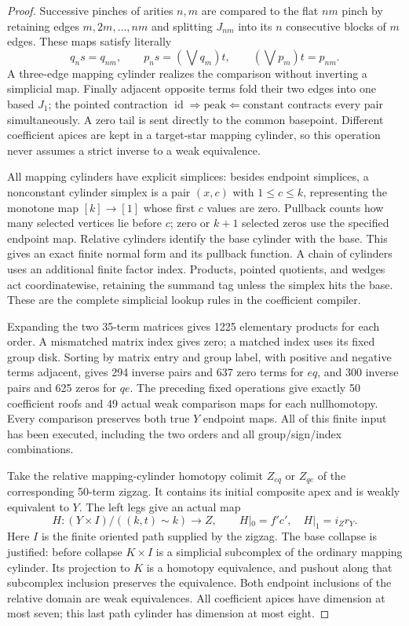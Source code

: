 \begin{proof}
Successive pinches of arities $n,m$ are compared to the flat
$nm$ pinch by retaining edges $m,2m,\ldots,nm$ and splitting
$J_{nm}$ into its $n$ consecutive blocks of $m$ edges. These maps
satisfy literally
\[
 q_ns=q_{nm},\qquad p_ns=(\bigvee q_m)t,\qquad
 (\bigvee p_m)t=p_{nm}.
\]
A three-edge mapping cylinder realizes the comparison without
inverting a simplicial map. Finally adjacent opposite terms fold
their two edges into one based $J_1$; the pointed contraction
$\operatorname{id}\Rightarrow\mathrm{peak}\Leftarrow\mathrm{constant}$
contracts every pair simultaneously. A zero tail is sent directly
to the common basepoint. Different coefficient apices are kept in
a target-star mapping cylinder, so this operation never assumes a
strict inverse to a weak equivalence.

All mapping cylinders have explicit simplices: besides endpoint
simplices, a nonconstant cylinder simplex is a pair $(x,c)$ with
$1\leq c\leq k$, representing the monotone map $[k]\to[1]$ whose
first $c$ values are zero. Pullback counts how many selected
vertices lie before $c$; zero or $k+1$ selected zeros use the
specified endpoint map. Relative cylinders identify the base
cylinder with the base. This gives an exact finite normal form
and its pullback function. A chain of cylinders uses an additional
finite factor index. Products, pointed quotients, and wedges act
coordinatewise, retaining the summand tag unless the simplex
hits the base. These are the complete simplicial lookup rules
in the coefficient compiler.

Expanding the two 35-term matrices gives 1225 elementary products
for each order. A mismatched matrix index gives zero; a matched
index uses its fixed group disk. Sorting by matrix entry and group
label, with positive and negative terms adjacent, gives 294 inverse
pairs and 637 zero terms for $eq$, and 300 inverse pairs and 625
zeros for $qe$. The preceding fixed operations give exactly 50
coefficient roofs and 49 actual weak comparison maps for each
nullhomotopy. Every comparison preserves both true $Y$ endpoint
maps. All of this finite input has been executed, including the
two orders and all group/sign/index combinations.

Take the relative mapping-cylinder homotopy colimit $Z_{eq}$ or
$Z_{qe}$ of the corresponding 50-term zigzag. It contains its
initial composite apex and is weakly equivalent to $Y$. The left
legs give an actual map
\[
 H:(Y\times I)/((k,t)\sim k)\longrightarrow Z,\qquad
 H|_0=f'c',\quad H|_1=i_Zr_Y.
\]
Here $I$ is the finite oriented path supplied by the zigzag.
The base collapse is justified: before collapse $K\times I$ is
a simplicial subcomplex of the ordinary mapping cylinder.
Its projection to $K$ is a homotopy equivalence, and pushout along
that subcomplex inclusion preserves the equivalence.
Both endpoint inclusions of the relative domain are weak
equivalences. All coefficient apices have dimension at most
seven; this last path cylinder has dimension at most eight.


\end{proof}

